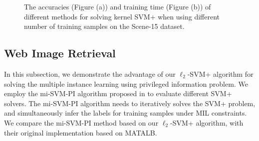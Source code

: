 \begin{figure}
\centering
{}
\caption{The accuracies (Figure (a)) and training time (Figure (b)) of different methods for solving kernel SVM+ when using different number of training samples on the Scene-15 dataset.}
\label{fig:nonlinear}
\end{figure}

\subsection{Web Image Retrieval}\label{sec:exp_nuswide}
In this subsection, we demonstrate the advantage of our $\ell_2$-SVM+
algorithm for solving the multiple instance learning using privileged
information problem. We employ the mi-SVM-PI algorithm proposed in
\cite{NiuIJCV2015} to evaluate different SVM+ solvers. The mi-SVM-PI
algorithm needs to iteratively solves the SVM+ problem, and
simultaneously infer the labels for training samples under MIL
constraints. We compare the mi-SVM-PI method based on our
$\ell_2$-SVM+ algorithm, with their original implementation based on
MATALB.

